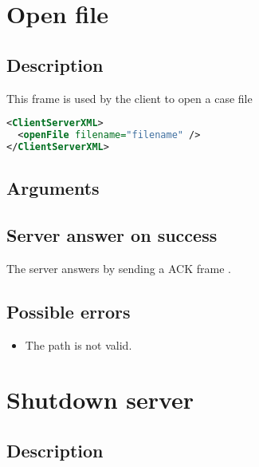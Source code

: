 
\section{Open file}
\label{openFile}

\subsection{Description}

This frame is used by the client to open a case file

\begin{lstlisting}[language=XML]
<ClientServerXML>
  <openFile filename="filename" />
</ClientServerXML>
\end{lstlisting}

\subsection{Arguments}

\subsection{Server answer on success}

The server answers by sending a ACK frame .

\subsection{Possible errors}

\begin{itemize}
 \item The path is not valid.
\end{itemize}


\section{Shutdown server}
\label{shutdownServer}

\subsection{Description}


